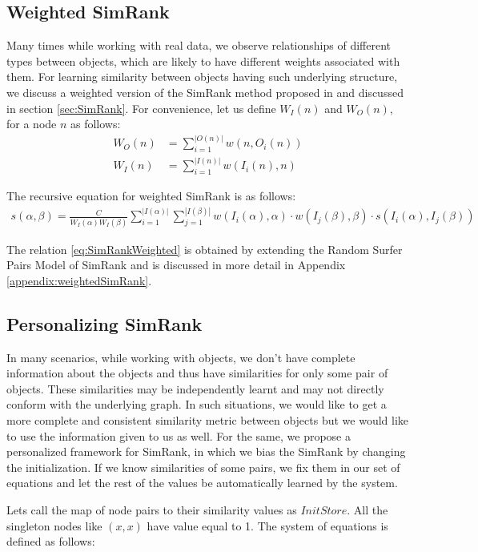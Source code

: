\subsection{Weighted SimRank}
Many times while working with real data, we observe relationships of different types between objects, which are likely to have different weights associated with them. For learning similarity between objects having such underlying structure, we discuss a weighted version of the SimRank method proposed in \citep{Jeh02simrank} and discussed in section \ref{sec:SimRank}. For convenience, let us define $W_{I}(n)$ and $W_{O}(n)$, for a node $n$ as follows:
\begin{align}
W_{O}(n) &= \sum_{i=1}^{|O(n)|} w(n,O_i(n)) \\
W_{I}(n) &= \sum_{i=1}^{|I(n)|} w(I_i(n),n)
\end{align}

The recursive equation for weighted SimRank is as follows:
\begin{align}
s(\alpha,\beta) = \frac{C}{W_{I}(\alpha)W_{I}(\beta)} \sum_{i=1}^{|I(\alpha)|} \sum_{j=1}^{|I(\beta)|} w(I_i(\alpha),\alpha) \cdot w(I_j(\beta),\beta) \cdot s(I_i(\alpha),I_j(\beta)) \label{eq:SimRankWeighted}
\end{align}

\noindent
The relation \ref{eq:SimRankWeighted} is obtained by extending the Random Surfer Pairs Model of SimRank and is discussed in more detail in Appendix \ref{appendix:weightedSimRank}.

\subsection{Personalizing SimRank}
\label{subsection:PersonalizedSimRank}
In many scenarios, while working with objects, we don't have complete information about the objects and thus have similarities for only some pair of objects. These similarities may be independently learnt and may not directly conform with the underlying graph. In such situations, we would like to get a more complete and consistent similarity metric between objects but we would like to use the information given to us as well. For the same, we propose a personalized framework for SimRank, in which we bias the SimRank by changing the initialization.
If we know similarities of some pairs, we fix them in our set of equations and let the rest of the values be automatically learned by the system.

Lets call the map of node pairs to their similarity values as $InitStore$. All the singleton nodes like $(x,x)$ have value equal to 1. The system of equations is defined as follows: 

